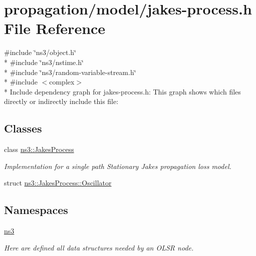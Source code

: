 \hypertarget{jakes-process_8h}{}\section{propagation/model/jakes-\/process.h File Reference}
\label{jakes-process_8h}
{\ttfamily \#include \char`\"{}ns3/object.\+h\char`\"{}}\\*
{\ttfamily \#include \char`\"{}ns3/nstime.\+h\char`\"{}}\\*
{\ttfamily \#include \char`\"{}ns3/random-\/variable-\/stream.\+h\char`\"{}}\\*
{\ttfamily \#include $<$complex$>$}\\*
Include dependency graph for jakes-\/process.h\+:
This graph shows which files directly or indirectly include this file\+:
\subsection*{Classes}
\begin{DoxyCompactItemize}
\item 
class \hyperlink{classns3_1_1JakesProcess}{ns3\+::\+Jakes\+Process}
\begin{DoxyCompactList}\small\item\em Implementation for a single path Stationary Jakes propagation loss model. \end{DoxyCompactList}\item 
struct \hyperlink{structns3_1_1JakesProcess_1_1Oscillator}{ns3\+::\+Jakes\+Process\+::\+Oscillator}
\end{DoxyCompactItemize}
\subsection*{Namespaces}
\begin{DoxyCompactItemize}
\item 
 \hyperlink{namespacens3}{ns3}
\begin{DoxyCompactList}\small\item\em Here are defined all data structures needed by an O\+L\+SR node. \end{DoxyCompactList}\end{DoxyCompactItemize}
